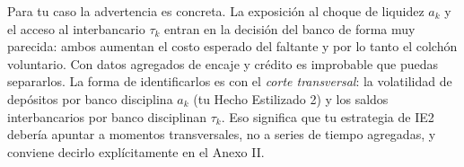 \begin{tutesis}
Para tu caso la advertencia es concreta. La exposición al choque de liquidez
$a_k$ y el acceso al interbancario $\tau_k$ entran en la decisión del banco de
forma muy parecida: ambos aumentan el costo esperado del faltante y por lo tanto
el colchón voluntario. Con datos agregados de encaje y crédito es improbable que
puedas separarlos. La forma de identificarlos es con el \emph{corte transversal}:
la volatilidad de depósitos por banco disciplina $a_k$ (tu Hecho Estilizado 2) y
los saldos interbancarios por banco disciplinan $\tau_k$. Eso significa que tu
estrategia de IE2 debería apuntar a momentos transversales, no a series de tiempo
agregadas, y conviene decirlo explícitamente en el Anexo II.
\end{tutesis}
